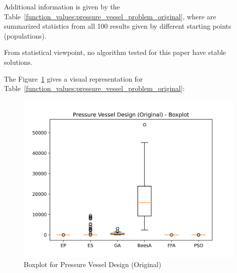 \documentclass[conference]{IEEEtran}
\begin{document}
Additional information is given by the Table~\ref{function_values:pressure_vessel_problem_original},
where are summarized statistics from all 100 results given by different starting points (populations).

\begin{table}[H]
\centering
\caption{Statistical Information about function values for Pressure Vessel Design (Original)}
\end{table}

From statistical viewpoint, no algorithm tested for this paper have stable solutions.



The Figure~\ref{fig:pressure_vessel_design_original_boxplot} gives a visual representation
for Table~\ref{function_values:pressure_vessel_problem_original}:

\begin{figure}[H]
\centering
\caption{Boxplot for Pressure Vessel Design (Original)}
\label{fig:pressure_vessel_design_original_boxplot}
\includegraphics[scale=0.5]{images/pressure_vessel_problem_original_boxplot.png}
\end{figure}
\end{document}
